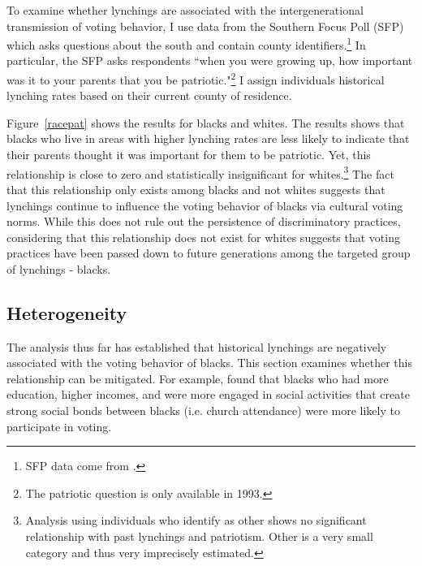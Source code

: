 \documentclass[AEJ, finalmode]{AEA}
\begin{document}
To examine whether lynchings are associated with the intergenerational transmission of voting behavior, I use data from the Southern Focus Poll (SFP) which asks questions about the south and contain county identifiers.\footnote{SFP data come from .} In particular, the SFP asks respondents ``when you were growing up, how important was it to your parents that you be patriotic."\footnote{The patriotic question is only available in 1993.} I assign individuals historical lynching rates based on their current county of residence. 

Figure~\ref{racepat} shows the results for blacks and whites. The results shows that blacks who live in areas with higher lynching rates are less likely to indicate that their parents thought it was important for them to be patriotic. Yet, this relationship is close to zero and statistically insignificant for whites.\footnote{Analysis using individuals who identify as other shows no significant relationship with past lynchings and patriotism. Other is a very small category and thus very imprecisely estimated.} The fact that this relationship only exists among blacks and not whites suggests that lynchings continue to influence the voting behavior of blacks via cultural voting norms. While this does not rule out the persistence of discriminatory practices, considering that this relationship does not exist for whites suggests that voting practices have been passed down to future generations among the targeted group of lynchings - blacks.

\subsection{Heterogeneity}

The analysis thus far has established that historical lynchings are negatively associated with the voting behavior of blacks. This section examines whether this relationship can be mitigated. For example,  found that blacks who had more education, higher incomes, and were more engaged in social activities that create strong social bonds between blacks (i.e. church attendance) were more likely to participate in voting. 
\end{document}
